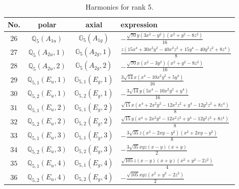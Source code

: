 \documentclass[fleqn,8pt,landscape]{jsarticle}
\begin{document}
\begin{table}[ht!]
\begin{center}
\caption{Harmonics for rank 5.}
\renewcommand{\arraystretch}{1.3}
\begin{tabular}{cccl} \hline \hline
No. & polar & axial & expression \\ \hline
$ 26 $ & $ \mathbb{Q}_{5}(A_{1u}) $ & $ \mathbb{G}_{5}(A_{1g}) $ & $ - \frac{\sqrt{70} y \left(3 x^{2} - y^{2}\right) \left(x^{2} + y^{2} - 8 z^{2}\right)}{16} $ \\
$ 27 $ & $ \mathbb{Q}_{5}(A_{2u},1) $ & $ \mathbb{G}_{5}(A_{2g},1) $ & $ \frac{z \left(15 x^{4} + 30 x^{2} y^{2} - 40 x^{2} z^{2} + 15 y^{4} - 40 y^{2} z^{2} + 8 z^{4}\right)}{8} $ \\
$ 28 $ & $ \mathbb{Q}_{5}(A_{2u},2) $ & $ \mathbb{G}_{5}(A_{2g},2) $ & $ - \frac{\sqrt{70} x \left(x^{2} - 3 y^{2}\right) \left(x^{2} + y^{2} - 8 z^{2}\right)}{16} $ \\
$ 29 $ & $ \mathbb{Q}_{5,1}(E_{u},1) $ & $ \mathbb{G}_{5,1}(E_{g},1) $ & $ \frac{3 \sqrt{14} x \left(x^{4} - 10 x^{2} y^{2} + 5 y^{4}\right)}{16} $ \\
$ 30 $ & $ \mathbb{Q}_{5,2}(E_{u},1) $ & $ \mathbb{G}_{5,2}(E_{g},1) $ & $ - \frac{3 \sqrt{14} y \left(5 x^{4} - 10 x^{2} y^{2} + y^{4}\right)}{16} $ \\
$ 31 $ & $ \mathbb{Q}_{5,1}(E_{u},2) $ & $ \mathbb{G}_{5,1}(E_{g},2) $ & $ \frac{\sqrt{15} x \left(x^{4} + 2 x^{2} y^{2} - 12 x^{2} z^{2} + y^{4} - 12 y^{2} z^{2} + 8 z^{4}\right)}{8} $ \\
$ 32 $ & $ \mathbb{Q}_{5,2}(E_{u},2) $ & $ \mathbb{G}_{5,2}(E_{g},2) $ & $ \frac{\sqrt{15} y \left(x^{4} + 2 x^{2} y^{2} - 12 x^{2} z^{2} + y^{4} - 12 y^{2} z^{2} + 8 z^{4}\right)}{8} $ \\
$ 33 $ & $ \mathbb{Q}_{5,1}(E_{u},3) $ & $ \mathbb{G}_{5,1}(E_{g},3) $ & $ - \frac{3 \sqrt{35} z \left(x^{2} - 2 x y - y^{2}\right) \left(x^{2} + 2 x y - y^{2}\right)}{8} $ \\
$ 34 $ & $ \mathbb{Q}_{5,2}(E_{u},3) $ & $ \mathbb{G}_{5,2}(E_{g},3) $ & $ - \frac{3 \sqrt{35} x y z \left(x - y\right) \left(x + y\right)}{2} $ \\
$ 35 $ & $ \mathbb{Q}_{5,1}(E_{u},4) $ & $ \mathbb{G}_{5,1}(E_{g},4) $ & $ \frac{\sqrt{105} z \left(x - y\right) \left(x + y\right) \left(x^{2} + y^{2} - 2 z^{2}\right)}{4} $ \\
$ 36 $ & $ \mathbb{Q}_{5,2}(E_{u},4) $ & $ \mathbb{G}_{5,2}(E_{g},4) $ & $ - \frac{\sqrt{105} x y z \left(x^{2} + y^{2} - 2 z^{2}\right)}{2} $ \\
 \hline \hline
\end{tabular}
\end{center}
\end{table}
\end{document}
